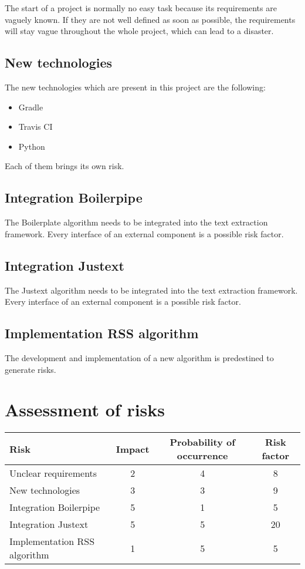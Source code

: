 The start of a project is normally no easy task because its requirements are vaguely known. If they are not well defined as soon as possible, the requirements will stay vague throughout the whole project, which can lead to a disaster. 

\subsection{New technologies}

The new technologies which are present in this project are the following:

 \begin{itemize}
    \item Gradle
    \item Travis CI
    \item Python
\end{itemize}

Each of them brings its own risk.

\subsection{Integration Boilerpipe}

The Boilerplate algorithm needs to be integrated into the text extraction framework. Every interface of an external component is a possible risk factor.

\subsection{Integration Justext}


The Justext algorithm needs to be integrated into the text extraction framework. Every interface of an external component is a possible risk factor.


\subsection{Implementation RSS algorithm}

The development and implementation of a new algorithm is predestined to generate risks.

\section{Assessment of risks}

\begin{table}[h]
\begin{tabular}{|l|c|c|c|}
\hline
\textbf{Risk} & \textbf{Impact} & \textbf{Probability of occurrence} & \textbf{Risk factor} \\ \hline
Unclear requirements & 2 & 4 & 8\\ \hline
New technologies & 3 & 3 & 9 \\ \hline
Integration Boilerpipe & 5 & 1 & 5\\ \hline
Integration Justext & 5 & 5 & 20 \\ \hline
Implementation RSS algorithm & 1 & 5 & 5\\ \hline
\end{tabular}
\end{table}

